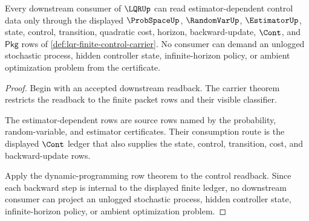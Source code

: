 \begin{theorem}
\label{thm:lqr-estimator-control-consumption-boundary}
Every downstream consumer of $\LQRUp$ can read estimator-dependent control data only through the displayed $\ProbSpaceUp$, $\RandomVarUp$, $\EstimatorUp$, state, control, transition, quadratic cost, horizon, backward-update, $\Cont$, and $\mathsf{Pkg}$ rows of \autoref{def:lqr-finite-control-carrier}. No consumer can demand an unlogged stochastic process, hidden controller state, infinite-horizon policy, or ambient optimization problem from the certificate.
\end{theorem}
\begin{proof}
Begin with an accepted downstream readback. The carrier theorem restricts the readback to the finite packet rows and their visible classifier.

The estimator-dependent rows are source rows named by the probability, random-variable, and estimator certificates. Their consumption route is the displayed $\Cont$ ledger that also supplies the state, control, transition, cost, and backward-update rows.

Apply the dynamic-programming row theorem to the control readback. Since each backward step is internal to the displayed finite ledger, no downstream consumer can project an unlogged stochastic process, hidden controller state, infinite-horizon policy, or ambient optimization problem.
\end{proof}

